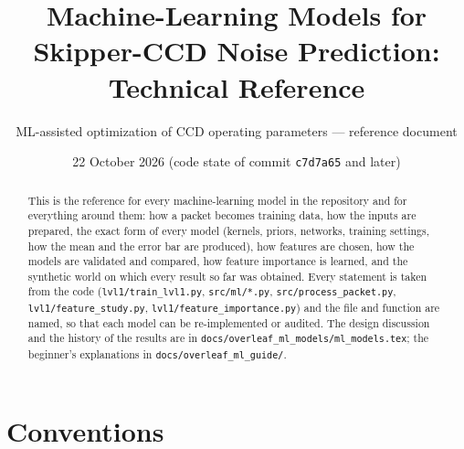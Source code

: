 \documentclass[10pt]{article}
\title{Machine-Learning Models for Skipper-CCD Noise Prediction:\\ Technical Reference}
\author{ML-assisted optimization of CCD operating parameters --- reference document}
\date{22 October 2026 (code state of commit \texttt{c7d7a65} and later)}
\newcommand{\code}[1]{\texttt{#1}}
\begin{document}
\maketitle

\begin{abstract}
This is the reference for every machine-learning model in the repository and for everything around them: how a packet
becomes training data, how the inputs are prepared, the exact form of every model (kernels, priors, networks, training
settings, how the mean and the error bar are produced), how features are chosen, how the models are validated and
compared, how feature importance is learned, and the synthetic world on which every result so far was obtained. Every
statement is taken from the code (\code{lvl1/train\_lvl1.py}, \code{src/ml/*.py}, \code{src/process\_packet.py},
\code{lvl1/feature\_study.py}, \code{lvl1/feature\_importance.py}) and the file and function are named, so that each
model can be re-implemented or audited. The design discussion and the history of the results are in
\code{docs/overleaf\_ml\_models/ml\_models.tex}; the beginner's explanations in \code{docs/overleaf\_ml\_guide/}.
\end{abstract}

\tableofcontents

\section{Conventions}
\label{sec:conv}
\end{document}
